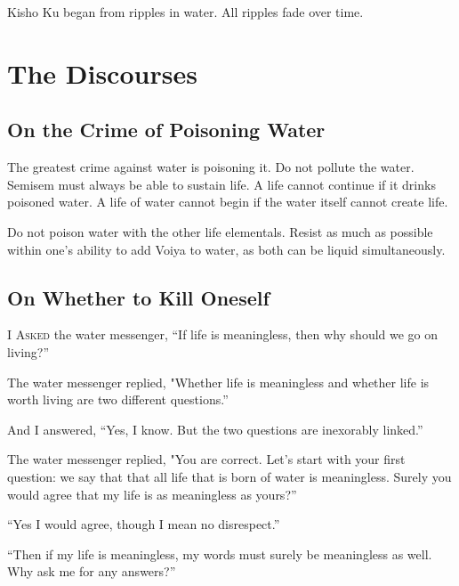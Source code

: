 \documentclass[12pt, letterpaper]{report}
\begin{document}
\vspace{1\baselineskip}
Kisho Ku began from ripples in water. All ripples fade over time.

\part{The Discourses}

\chapter{On the Crime of Poisoning Water}

The greatest crime against water is poisoning it. Do not pollute the water. Semisem must always be able to sustain life. A life cannot continue if it drinks poisoned water. A life of water cannot begin if the water itself cannot create life.

\vspace{1\baselineskip}
Do not poison water with the other life elementals. Resist as much as possible within one's ability to add Voiya to water, as both can be liquid simultaneously.

\chapter{On Whether to Kill Oneself}

\vspace{1\baselineskip}
I A\textsc{sked} the water messenger, ``If life is meaningless, then why should we go on living?''

\vspace{1\baselineskip}
The water messenger replied, "Whether life is meaningless and whether life is worth living are two different questions.''

\vspace{1\baselineskip}
And I answered, ``Yes, I know. But the two questions are inexorably linked.''

\vspace{1\baselineskip}
The water messenger replied, "You are correct. Let's start with your first question: we say that that all life that is born of water is meaningless. Surely you would agree that my life is as meaningless as yours?''

\vspace{1\baselineskip}
``Yes I would agree, though I mean no disrespect.''

\vspace{1\baselineskip}
``Then if my life is meaningless, my words must surely be meaningless as well. Why ask me for any answers?''
\end{document}
